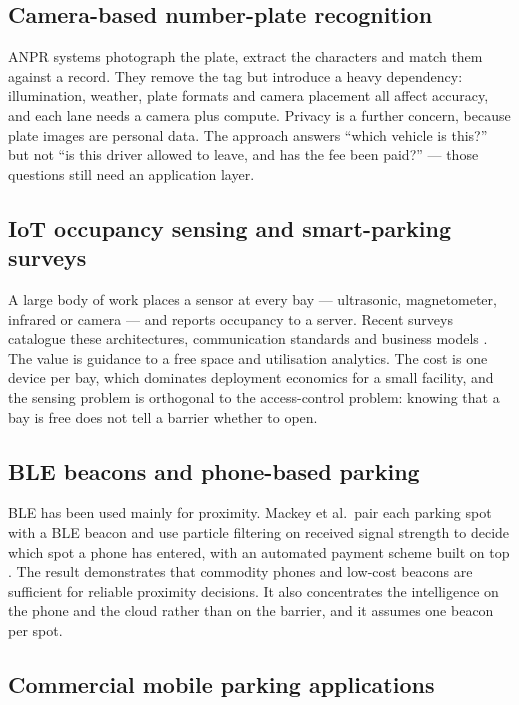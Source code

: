 \subsection{Camera-based number-plate recognition}

ANPR systems photograph the plate, extract the characters and match them against a
record. They remove the tag but introduce a heavy dependency: illumination,
weather, plate formats and camera placement all affect accuracy, and each lane needs
a camera plus compute. Privacy is a further concern, because plate images are
personal data. The approach answers ``which vehicle is this?'' but not ``is this
driver allowed to leave, and has the fee been paid?'' --- those questions still need
an application layer.

\subsection{IoT occupancy sensing and smart-parking surveys}

A large body of work places a sensor at every bay --- ultrasonic, magnetometer,
infrared or camera --- and reports occupancy to a server. Recent surveys catalogue
these architectures, communication standards and business models
\cite{alam2023,biyik2021}. The value is guidance to a free space and utilisation
analytics. The cost is one device per bay, which dominates deployment economics for
a small facility, and the sensing problem is orthogonal to the access-control
problem: knowing that a bay is free does not tell a barrier whether to open.

\subsection{BLE beacons and phone-based parking}

BLE has been used mainly for proximity. Mackey et al.\ pair each parking spot with a
BLE beacon and use particle filtering on received signal strength to decide which
spot a phone has entered, with an automated payment scheme built on top
\cite{mackey2020}. The result demonstrates that commodity phones and low-cost
beacons are sufficient for reliable proximity decisions. It also concentrates the
intelligence on the phone and the cloud rather than on the barrier, and it assumes
one beacon per spot.

\subsection{Commercial mobile parking applications}

